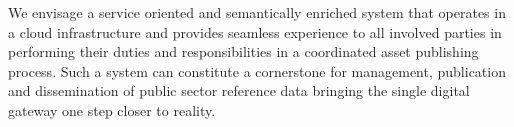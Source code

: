     We envisage a service oriented and semantically enriched system that operates in a cloud infrastructure and provides seamless experience to all involved parties in performing their duties and responsibilities in a  coordinated asset publishing process. Such a system can constitute a cornerstone for management, publication and dissemination of public sector reference data bringing the single digital gateway one step closer to reality. 
    
	
 
 
 
 
 
 
 
 
 
 

 